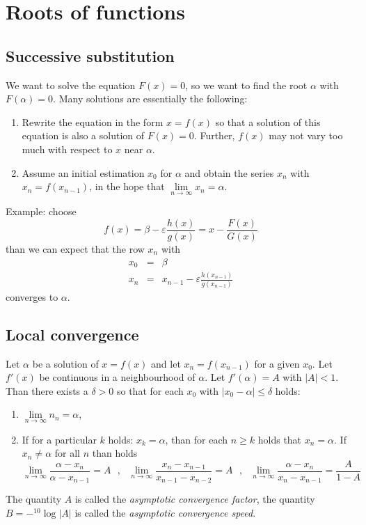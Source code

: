 \section{Roots of functions}
\subsection{Successive substitution}
We want to solve the equation $F(x)=0$, so we want to find the root
$\alpha$ with $F(\alpha)=0$.
\npar
Many solutions are essentially the following:
\begin{enumerate}
\item Rewrite the equation in the form $x=f(x)$ so that a solution of this
      equation is also a solution of $F(x)=0$. Further, $f(x)$ may not vary
      too much with respect to $x$ near $\alpha$.
\item Assume an initial estimation $x_0$ for $\alpha$ and obtain the series
      $x_n$ with $x_n=f(x_{n-1})$, in the hope that $\lim\limits_{n\rightarrow\infty}x_n=\alpha$.
\end{enumerate}
Example: choose
\[
f(x)=\beta-\varepsilon\frac{h(x)}{g(x)}=x-\frac{F(x)}{G(x)}
\]
than we can expect that the row $x_n$ with
\begin{eqnarray*}
x_0&=&\beta\\
x_n&=&x_{n-1}-\varepsilon\frac{h(x_{n-1})}{g(x_{n-1})}
\end{eqnarray*}
converges to $\alpha$.

\subsection{Local convergence}
Let $\alpha$ be a solution of $x=f(x)$ and let $x_n=f(x_{n-1})$ for a given
$x_0$. Let $f'(x)$ be continuous in a neighbourhood of $\alpha$. Let
$f'(\alpha)=A$ with $|A|<1$. Than there exists a $\delta>0$ so that for each
$x_0$ with $|x_0-\alpha|\leq\delta$ holds:
\begin{enumerate}
\item $\lim\limits_{n\rightarrow\infty}n_n=\alpha$,
\item If for a particular $k$ holds: $x_k=\alpha$, than for each $n\geq k$
      holds that $x_n=\alpha$. If $x_n\neq\alpha$ for all $n$ than holds
\[
\lim_{n\rightarrow\infty}\frac{\alpha-x_n}{\alpha-x_{n-1}}=A~~~,~~~
\lim_{n\rightarrow\infty}\frac{x_n-x_{n-1}}{x_{n-1}-x_{n-2}}=A~~~,~~~
\lim_{n\rightarrow\infty}\frac{\alpha-x_n}{x_n-x_{n-1}}=\frac{A}{1-A}
\]
\end{enumerate}
The quantity $A$ is called the {\it asymptotic convergence factor}, the
quantity $B=-{}^{10}\log|A|$ is called the {\it asymptotic convergence speed}.

